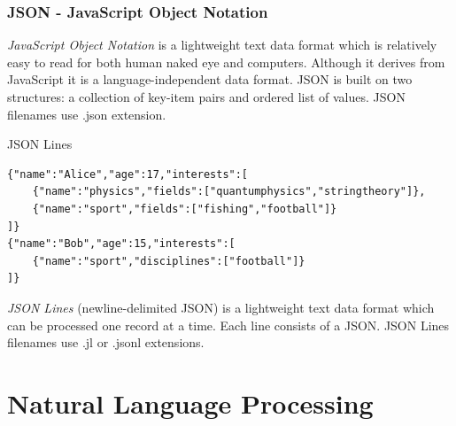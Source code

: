 \begin{frame}
    \frametitle{JSON - JavaScript Object Notation}
    \begin{definition}
        \emph{JavaScript Object Notation} is a lightweight text data format which is relatively easy to read for both human naked eye and computers. Although it derives from JavaScript it is a language-independent data format. JSON is built on two structures: a collection of key-item pairs and ordered list of values. JSON filenames use .json extension.
    \end{definition}
\end{frame}


\begin{frame}[fragile]{JSON Lines}
\begin{verbatim}
{"name":"Alice","age":17,"interests":[
    {"name":"physics","fields":["quantumphysics","stringtheory"]},
    {"name":"sport","fields":["fishing","football"]}
]}
{"name":"Bob","age":15,"interests":[
    {"name":"sport","disciplines":["football"]}
]}
\end{verbatim}
\begin{definition}
    \emph{JSON Lines} (newline-delimited JSON) is a lightweight text data format which can be processed one record at a time. Each line consists of a JSON. JSON Lines filenames use .jl or .jsonl extensions.
\end{definition}
\end{frame}

\section[NLP]{Natural Language Processing}

